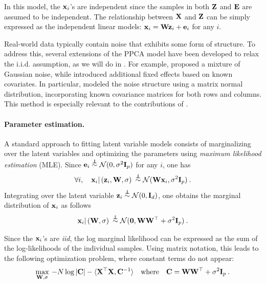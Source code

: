 In this model, the ${\mathbf{x}}_i$'s are independent since the samples in both ${\mathbf{Z}}$ and ${\mathbf{E}}$ are assumed to be independent. The relationship between ${\mathbf{X}}$ and ${\mathbf{Z}}$ can be simply expressed as the independent linear models: ${\mathbf{x}}_i = {\mathbf{W}} {\mathbf{z}}_i + {\mathbf{e}}_i$ for any $i$.

\begin{remark}
    Real-world data typically contain noise that exhibits some form of structure. To address this, several extensions of the PPCA model have been developed to relax the i.i.d. assumption, as we will do in . For example, \cite{zhao2014robust} proposed a mixture of Gaussian noise, while \cite{kalaitzis2011residual} introduced additional fixed effects based on known covariates. In particular, \cite{allen2014generalized} modeled the noise structure using a matrix normal distribution, incorporating known covariance matrices for both rows and columns. This method is especially relevant to the contributions of .
\end{remark}


\paragraph{Parameter estimation.} A standard approach to fitting latent variable models consists of marginalizing over the latent variables and optimizing the parameters using \emph{maximum likelihood estimation} (MLE). Since ${\mathbf{e}}_i \stackrel{\perp\!\!\!\!\perp}{\sim} \mathcal{N}(0, \sigma^2 {\mathbf{I}}_p)$ for any $i$, one has
\begin{align}\label{eq:ppca_likelihood}
    \forall i, \quad {\mathbf{x}}_i | \left( {\mathbf{z}}_i, {\mathbf{W}}, \sigma \right) \: \stackrel{\perp\!\!\!\!\perp}{\sim} \mathcal{N}({\mathbf{W}} {\mathbf{x}}_i, \sigma^2 {\mathbf{I}}_p) \:.
\end{align}
Integrating over the latent variable ${\mathbf{z}}_i \stackrel{\perp\!\!\!\!\perp}{\sim} \mathcal{N}(0, {\mathbf{I}}_d)$, one obtains the marginal distribution of ${\mathbf{x}}_i$ as follows
\begin{align}\label{eq:ppca_marginal}
    {\mathbf{x}}_i | \left( {\mathbf{W}}, \sigma \right) \: \stackrel{\perp\!\!\!\!\perp}{\sim} \mathcal{N}(\bm{0}, {\mathbf{W}} {\mathbf{W}}^\top + \sigma^2 {\mathbf{I}}_p) \:.
\end{align}

Since the ${\mathbf{x}}_i$'s are \emph{iid}, the log marginal likelihood can be expressed as the sum of the log-likelihoods of the individual samples. Using matrix notation, this leads to the following optimization problem, where constant terms do not appear:
\begin{align}
    \max_{{\mathbf{W}}, \sigma} \: -N \log |{\mathbf{C}}| - \langle {\mathbf{X}}^\top {\mathbf{X}}, {\mathbf{C}}^{-1} \rangle \quad \text{where} \quad {\mathbf{C}} = {\mathbf{W}} {\mathbf{W}}^\top + \sigma^2 {\mathbf{I}}_p \:.
\end{align}

